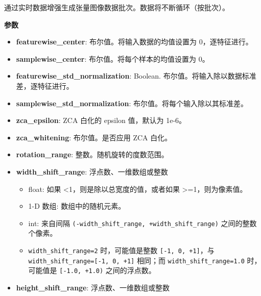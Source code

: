 通过实时数据增强生成张量图像数据批次。数据将不断循环（按批次）。

\textbf{参数}

\begin{itemize}
\tightlist
\item
  \textbf{featurewise\_center}: 布尔值。将输入数据的均值设置为
  0，逐特征进行。
\item
  \textbf{samplewise\_center}: 布尔值。将每个样本的均值设置为 0。
\item
  \textbf{featurewise\_std\_normalization}: Boolean.
  布尔值。将输入除以数据标准差，逐特征进行。
\item
  \textbf{samplewise\_std\_normalization}:
  布尔值。将每个输入除以其标准差。
\item
  \textbf{zca\_epsilon}: ZCA 白化的 epsilon 值，默认为 1e-6。
\item
  \textbf{zca\_whitening}: 布尔值。是否应用 ZCA 白化。
\item
  \textbf{rotation\_range}: 整数。随机旋转的度数范围。
\item
  \textbf{width\_shift\_range}: 浮点数、一维数组或整数

  \begin{itemize}
  \tightlist
  \item
    float: 如果 \textless{}1，则是除以总宽度的值，或者如果
    \textgreater{}=1，则为像素值。
  \item
    1-D 数组: 数组中的随机元素。
  \item
    int: 来自间隔 \texttt{(-width\_shift\_range,\ +width\_shift\_range)}
    之间的整数个像素。
  \item
    \texttt{width\_shift\_range=2} 时，可能值是整数
    \texttt{{[}-1,\ 0,\ +1{]}}，与
    \texttt{width\_shift\_range={[}-1,\ 0,\ +1{]}} 相同；而
    \texttt{width\_shift\_range=1.0} 时，可能值是
    \texttt{{[}-1.0,\ +1.0)} 之间的浮点数。
  \end{itemize}
\item
  \textbf{height\_shift\_range}: 浮点数、一维数组或整数


\end{itemize}
